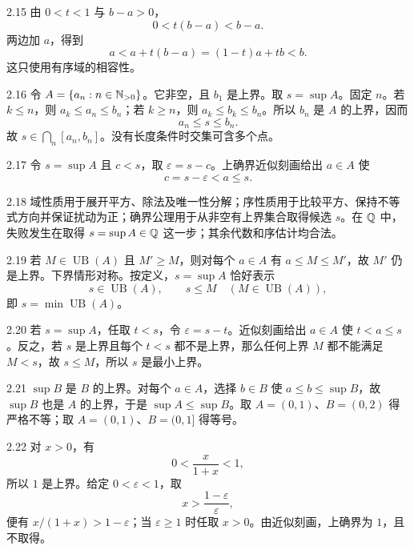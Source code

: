 \begin{solution}{2.15}
由 \(0<t<1\) 与 \(b-a>0\)，
\[
 0<t(b-a)<b-a.
\]
两边加 \(a\)，得到
\[
 a<a+t(b-a)=(1-t)a+tb<b.
\]
这只使用有序域的相容性。
\end{solution}

\begin{solution}{2.16}
令 \(A=\{a_n:n\in\mathbb{N}_{>0}\}\)。它非空，且 \(b_1\) 是上界。取 \(s=\sup A\)。固定 \(n\)。若 \(k\le n\)，则 \(a_k\le a_n\le b_n\)；若 \(k\ge n\)，则 \(a_k\le b_k\le b_n\)。所以 \(b_n\) 是 \(A\) 的上界，因而
\[
 a_n\le s\le b_n.
\]
故 \(s\in\bigcap_n[a_n,b_n]\)。没有长度条件时交集可含多个点。
\end{solution}

\begin{solution}{2.17}
令 \(s=\sup A\) 且 \(c<s\)，取 \(\varepsilon=s-c\)。上确界近似刻画给出 \(a\in A\) 使
\[
 c=s-\varepsilon<a\le s.
\]
\end{solution}

\begin{solution}{2.18}
域性质用于展开平方、除法及唯一性分解；序性质用于比较平方、保持不等式方向并保证扰动为正；确界公理用于从非空有上界集合取得候选 \(s\)。在 \(\mathbb{Q}\) 中，失败发生在取得 \(s=\sup A\in\mathbb{Q}\) 这一步；其余代数和序估计均合法。
\end{solution}

\begin{solution}{2.19}
若 \(M\in\operatorname{UB}(A)\) 且 \(M'\ge M\)，则对每个 \(a\in A\) 有 \(a\le M\le M'\)，故 \(M'\) 仍是上界。下界情形对称。按定义，\(s=\sup A\) 恰好表示
\[
 s\in\operatorname{UB}(A),\qquad
 s\le M\quad(M\in\operatorname{UB}(A)),
\]
即 \(s=\min\operatorname{UB}(A)\)。
\end{solution}

\begin{solution}{2.20}
若 \(s=\sup A\)，任取 \(t<s\)，令 \(\varepsilon=s-t\)。近似刻画给出 \(a\in A\) 使 \(t<a\le s\)。反之，若 \(s\) 是上界且每个 \(t<s\) 都不是上界，那么任何上界 \(M\) 都不能满足 \(M<s\)，故 \(s\le M\)，所以 \(s\) 是最小上界。
\end{solution}

\begin{solution}{2.21}
\(\sup B\) 是 \(B\) 的上界。对每个 \(a\in A\)，选择 \(b\in B\) 使 \(a\le b\le\sup B\)，故 \(\sup B\) 也是 \(A\) 的上界，于是 \(\sup A\le\sup B\)。取 \(A=(0,1)\)、\(B=(0,2)\) 得严格不等；取 \(A=(0,1)\)、\(B=(0,1]\) 得等号。
\end{solution}

\begin{solution}{2.22}
对 \(x>0\)，有
\[
 0<\frac{x}{1+x}<1,
\]
所以 \(1\) 是上界。给定 \(0<\varepsilon<1\)，取
\[
 x>\frac{1-\varepsilon}{\varepsilon},
\]
便有 \(x/(1+x)>1-\varepsilon\)；当 \(\varepsilon\ge1\) 时任取 \(x>0\)。由近似刻画，上确界为 \(1\)，且不取得。
\end{solution}

